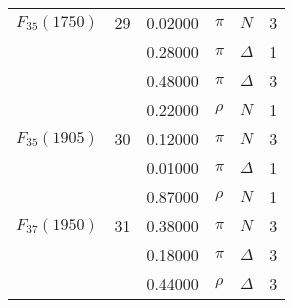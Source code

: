 \documentclass[a4paper,10pt]{article}
\begin{document}
\begin{tabular}[t]{|lr|l|ll|l|}
\hline
$      F_{35}(1750)  $& 29& 0.02000&$ \pi                 $ &$ N                   $& 3\\
$                    $&   & 0.28000&$ \pi                 $ &$ \Delta              $& 1\\
$                    $&   & 0.48000&$ \pi                 $ &$ \Delta              $& 3\\
$                    $&   & 0.22000&$ \rho                $ &$ N                   $& 1\\
\hline
$      F_{35}(1905)  $& 30& 0.12000&$ \pi                 $ &$ N                   $& 3\\
$                    $&   & 0.01000&$ \pi                 $ &$ \Delta              $& 1\\
$                    $&   & 0.87000&$ \rho                $ &$ N                   $& 1\\
\hline
$      F_{37}(1950)  $& 31& 0.38000&$ \pi                 $ &$ N                   $& 3\\
$                    $&   & 0.18000&$ \pi                 $ &$ \Delta              $& 3\\
$                    $&   & 0.44000&$ \rho                $ &$ \Delta              $& 3\\
\hline
\end{tabular}
 
\end{document}
